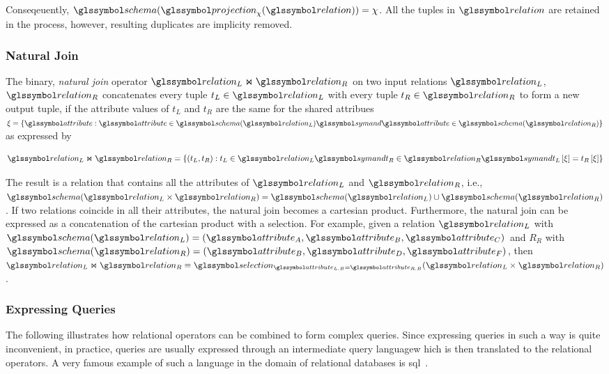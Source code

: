 Conseqeuently, $\schema(\projection_{\chi}(\relation)) = \chi$. All the tuples in $\relation$ are retained in the process, however, resulting duplicates are implicity removed.

\subsubsection{Natural Join}

The binary, \emph{natural join} operator $\relation_L \Join \relation_R$ on two input relations $\relation_L$, $\relation_R$ concatenates every tuple $t_{L} \in \relation_L$ with every tuple $t_{R} \in \relation_R$ to form a new output tuple, if the attribute values of $t_{L}$ and $t_{R}$ are the same for the shared attribues $\xi = \{ \attribute : \attribute \in \schema(\relation_L) \symand \attribute \in \schema(\relation_R) \}$ as expressed by 

\begin{equation}
    \label{equation:rel_op_join}
    \relation_L \Join \relation_R = \{ (t_L, t_R) : t_L \in \relation_L \symand t_R \in \relation_R \symand t_L\left[ \xi \right] = t_R\left[ \xi \right] \}
\end{equation}

The result is a relation that contains all the attributes of $\relation_L$ and $\relation_R$, i.e., $\schema(\relation_L \times \relation_R) = \schema(\relation_L) \cup \schema(\relation_R)$. If two relations coincide in all their attributes, the natural join becomes a cartesian product. Furthermore, the natural join can be expressed as a concatenation of the cartesian product with a selection. For example, given a relation $\relation_L$ with $\schema(\relation_L) = (\attribute_A, \attribute_B, \attribute_C)$ and $R_R$ with $\schema(\relation_R) = (\attribute_B, \attribute_D, \attribute_F)$, then $\relation_L \Join \relation_R \equiv \selection_{\attribute_{L.B} = \attribute_{R.B}}(\relation_L \times \relation_R)$.

\subsubsection{Expressing Queries}

The following  illustrates how relational operators can be combined to form complex queries. Since expressing queries in such a way is quite inconvenient, in practice, queries are usually expressed through an intermediate query languagew hich is then translated to the relational operators. A very famous example of such a language in the domain of relational databases is \acrfull{sql}~\cite{Chamberlin:2012Early}.

